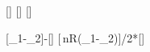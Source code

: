 [\mole]
[\celsius]
[\celsius]

[\vartheta_1-\vartheta_2]{\TaX-\TbX}[\kelvin]
[\,nR\left(\vartheta_1-\vartheta_2\right)]{\fHX/2*\nWsX*\ncRX*\dTX}[\joule]
